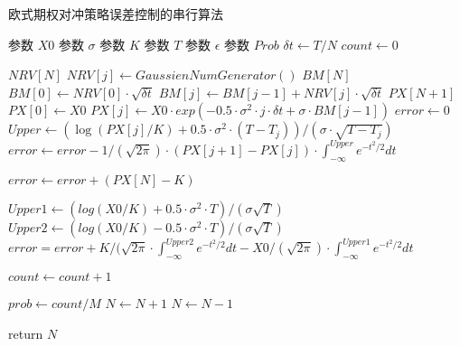 \begin{algorithm}
  \caption{欧式期权对冲策略误差控制的串行算法}
  \label{alg:bserror}
	\begin{algorithmic}[1]
	 \State 参数 $X0$ 
	 \State 参数 $\sigma$ 
	 \State 参数 $K$ 
	 \State 参数 $T$ 
	 \State 参数 $\epsilon$ 
	 \State 参数 $Prob$ 
	  	  
	  \State $\delta t \gets T/N$ 
	  \State $count \gets 0$ 

	   
	  \State $NRV[N]$  
	     $NRV[j] \gets GaussienNumGenerator()$
	  \EndFor
	  \State $BM[N]$   
	  \State $BM[0] \gets NRV[0] \cdot \sqrt{\delta t}$ 
	     $BM[j] \gets BM[j-1] + NRV[j]\cdot \sqrt{\delta t}$ 
	  \EndFor
	  \State $PX[N+1]$ 
	  \State $PX[0] \gets X0$
	  \State $PX[j]\gets X0 \cdot exp(-0.5\cdot \sigma^2 \cdot j \cdot \delta t + \sigma \cdot BM[j-1])$
	  \EndFor
      \State $error \gets 0$ 
	  \State $Upper \gets (\log(PX[j]/K) + 0.5\cdot \sigma^2 \cdot (T- T_j))/ (\sigma \cdot \sqrt{T-T_j})$ 
	  \State $error \gets error - 1/(\sqrt{2\pi}) \cdot (PX[j+1]-PX[j])\cdot \int_{-\infty}^{Upper}e^{-t^2/2}dt $
	  \EndFor

	   
	  \State $error \gets error + (PX[N]-K)$
	  \EndIf

	  \State $Upper1 \gets (log(X0/K) + 0.5\cdot \sigma^2 \cdot T)/(\sigma \sqrt{T})$
	  \State $Upper2 \gets (log(X0/K) - 0.5\cdot \sigma^2 \cdot T)/(\sigma \sqrt{T})$
	  \State $error = error + K/(\sqrt{2\pi} \cdot \int_{-\infty}^{Upper2}e^{-t^2/2}dt -X0/(\sqrt{2\pi})\cdot \int_{-\infty}^{Upper1}e^{-t^2/2}dt$
	  
	  \State $count \gets count + 1$ 
	  \EndIf
	  \EndFor

	  \State $prob \gets count/M$
	  \State $N \gets N + 1$
	  \Else
	  \State $N \gets N - 1$
	  \EndIf

	  \State return $N$
	 \EndProcedure
  \end{algorithmic}
\end{algorithm}


